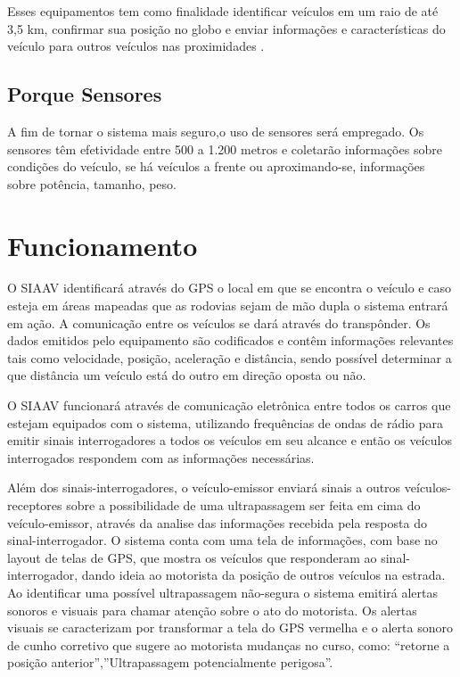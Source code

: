 Esses equipamentos  tem como finalidade identificar veículos em um raio de até 3,5 km, confirmar sua posição no globo e enviar informações e características do veículo para outros veículos nas proximidades \cite{transponder}.

\subsection{Porque Sensores}

A fim de tornar o sistema mais seguro,o uso de sensores será empregado. Os sensores têm efetividade entre 500 a 1.200 metros e coletarão informações sobre condições do veículo, se há veículos a frente ou aproximando-se, informações sobre potência, tamanho, peso.

\section{Funcionamento}

O SIAAV identificará através do GPS o local em que se encontra o veículo e caso esteja em áreas mapeadas que as rodovias sejam de mão dupla o sistema entrará em ação.
A comunicação entre os veículos se dará através do transpônder. Os dados emitidos pelo equipamento são codificados e contêm informações relevantes tais como velocidade, posição, aceleração e distância, sendo possível determinar a que distância um veículo está do outro em direção oposta ou não.

O SIAAV funcionará através de comunicação eletrônica entre todos os carros que estejam equipados com o sistema, utilizando frequências de ondas de rádio para emitir sinais interrogadores a todos os veículos em seu alcance e então os veículos interrogados respondem com as informações necessárias.

Além dos sinais-interrogadores, o veículo-emissor enviará sinais a outros veículos-receptores sobre a possibilidade de uma ultrapassagem ser feita em cima do veículo-emissor, através da analise das informações recebida pela resposta do sinal-interrogador.
O sistema conta com uma tela de informações, com base no layout de telas de GPS, que mostra os veículos que responderam ao sinal-interrogador, dando ideia ao motorista da posição de outros veículos na estrada.
Ao identificar uma possível ultrapassagem não-segura o sistema emitirá alertas sonoros e visuais para chamar atenção sobre o ato do motorista. Os alertas visuais se caracterizam por transformar a tela do GPS vermelha e o alerta sonoro de cunho corretivo que sugere ao motorista mudanças no curso, como: “retorne a posição anterior”,”Ultrapassagem potencialmente perigosa”.

